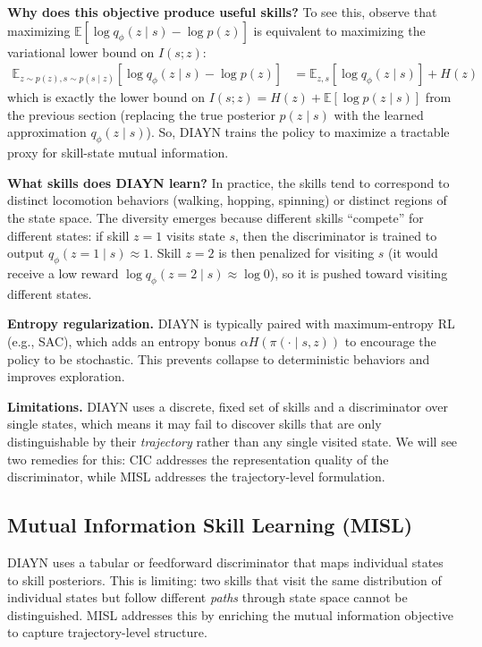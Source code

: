 \documentclass[11pt, letterpaper]{article}
\begin{document}
\begin{remark}
    \textbf{Why does this objective produce useful skills?} To see this, observe that maximizing \(\mathbb{E}[\log q_\phi(z \mid s) - \log p(z)]\) is equivalent to maximizing the variational lower bound on \(I(s; z)\):
    \begin{align*}
        \mathbb{E}_{z \sim p(z), s \sim p(s \mid z)} [\log q_\phi(z \mid s) - \log p(z)]
        &= \mathbb{E}_{z, s}[\log q_\phi(z \mid s)] + H(z)
    \end{align*}
    which is exactly the lower bound on \(I(s; z) = H(z) + \mathbb{E}[\log p(z \mid s)]\) from the previous section (replacing the true posterior \(p(z \mid s)\) with the learned approximation \(q_\phi(z \mid s)\)). So, DIAYN trains the policy to maximize a tractable proxy for skill-state mutual information.
 
    \textbf{What skills does DIAYN learn?} In practice, the skills tend to correspond to distinct locomotion behaviors (walking, hopping, spinning) or distinct regions of the state space. The diversity emerges because different skills ``compete'' for different states: if skill \(z = 1\) visits state \(s\), then the discriminator is trained to output \(q_\phi(z=1 \mid s) \approx 1\). Skill \(z = 2\) is then penalized for visiting \(s\) (it would receive a low reward \(\log q_\phi(z=2 \mid s) \approx \log 0\)), so it is pushed toward visiting different states.
 
    \textbf{Entropy regularization.} DIAYN is typically paired with maximum-entropy RL (e.g., SAC), which adds an entropy bonus \(\alpha H(\pi(\cdot \mid s, z))\) to encourage the policy to be stochastic. This prevents collapse to deterministic behaviors and improves exploration.
 
    \textbf{Limitations.} DIAYN uses a discrete, fixed set of skills and a discriminator over single states, which means it may fail to discover skills that are only distinguishable by their \textit{trajectory} rather than any single visited state. We will see two remedies for this: CIC addresses the representation quality of the discriminator, while MISL addresses the trajectory-level formulation.
\end{remark}
 
\subsection{Mutual Information Skill Learning (MISL)}
 
DIAYN uses a tabular or feedforward discriminator that maps individual states to skill posteriors. This is limiting: two skills that visit the same distribution of individual states but follow different \textit{paths} through state space cannot be distinguished. MISL addresses this by enriching the mutual information objective to capture trajectory-level structure.
 
\end{document}
